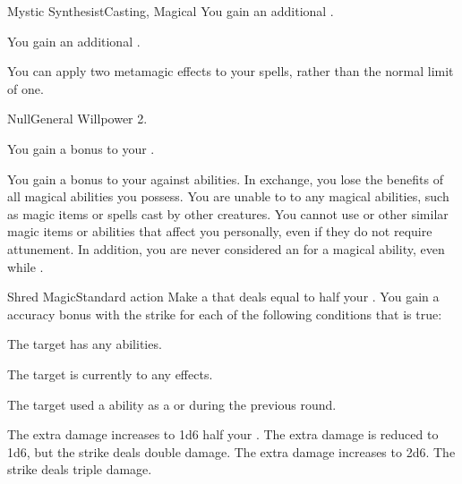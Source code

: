 \begin{magicalfeat}{Mystic Synthesist}{Casting, Magical}
     You gain an additional .

     You gain an additional .

     You can apply two metamagic effects to your spells, rather than the normal limit of one.
  \end{magicalfeat}

  \begin{feat}{Null}{General}
    \featpre Willpower 2.

     You gain a  bonus to your .

     You gain a  bonus to your  against \magical abilities.
    In exchange, you lose the benefits of all magical abilities you possess.
    You are unable to  to any magical abilities, such as magic items or spells cast by other creatures.
    You cannot use  or other similar magic items or abilities that affect you personally, even if they do not require attunement.
    In addition, you are never considered an  for a magical ability, even while \unconscious.

    \begin{activeability}{Shred Magic}{Standard action}
      \rankline
      Make a  that deals  equal to half your .
      You gain a  accuracy bonus with the strike for each of the following conditions that is true:
      \begin{raggeditemize}
        \item The target has any \magical abilities.
        \item The target is currently  to any effects.
        \item The target used a \magical ability as a  or  during the previous round.
      \end{raggeditemize}

      \rankline
       The extra damage increases to 1d6 \add half your .
       The extra damage is reduced to 1d6, but the strike deals double damage.
       The extra damage increases to 2d6.
       The strike deals triple damage.
  \end{activeability}


\end{feat}
